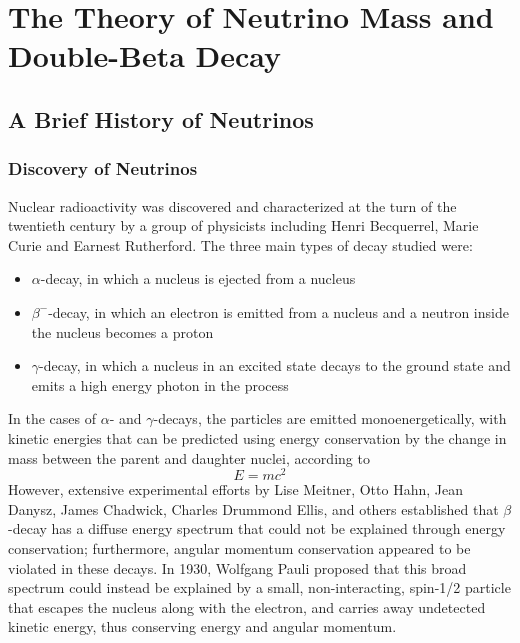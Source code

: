 \documentclass[/main.tex]{subfiles}
\begin{document}
\graphicspath{{./pics/}{ch1/pics/}}

\onlyinsubfile{\textpages}
\chapter{The Theory of Neutrino Mass and Double-Beta Decay}

\section{A Brief History of Neutrinos}
\subsection{Discovery of Neutrinos}
Nuclear radioactivity was discovered and characterized at the turn of the twentieth century by a group of physicists including Henri Becquerrel, Marie Curie and Earnest Rutherford.
The three main types of decay studied were:
\begin{itemize}
\item $\alpha$-decay, in which a  nucleus is ejected from a nucleus
\item $\beta^-$-decay, in which an electron is emitted from a nucleus and a neutron inside the nucleus becomes a proton
\item $\gamma$-decay, in which a nucleus in an excited state decays to the ground state and emits a high energy photon in the process
\end{itemize}
In the cases of $\alpha$- and $\gamma$-decays, the particles are emitted monoenergetically, with kinetic energies that can be predicted using energy conservation by the change in mass between the parent and daughter nuclei, according to
\begin{equation}
  E=mc^2
\end{equation}
However, extensive experimental efforts by Lise Meitner, Otto Hahn, Jean Danysz, James Chadwick, Charles Drummond Ellis, and others established that $\beta$-decay has a diffuse energy spectrum that could not be explained through energy conservation; furthermore, angular momentum conservation appeared to be violated in these decays.
In 1930, Wolfgang Pauli proposed that this broad spectrum could instead be explained by a small, non-interacting, spin-1/2 particle that escapes the nucleus along with the electron, and carries away undetected kinetic energy, thus conserving energy and angular momentum.
\end{document}
